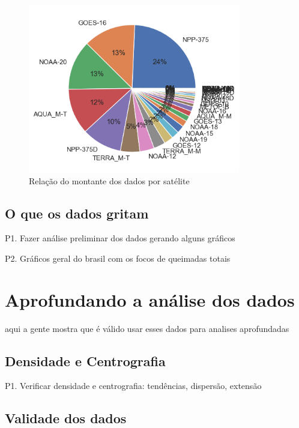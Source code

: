 \documentclass[cic,tc]{iiufrgs}
\begin{document}
\begin{figure}
    \caption{Relação do montante dos dados por satélite}
    \begin{center}
        \includegraphics[width=25em]{porcentagem_satelites}
    \end{center}
    \label{fig:porcentagem_satelites}
\end{figure}

\section{O que os dados gritam}

P1. Fazer análise preliminar dos dados gerando alguns gráficos \par
P2. Gráficos geral do brasil com os focos de queimadas totais \cite{geographicDataSciencePython} \par


\chapter{Aprofundando a análise dos dados}

aqui a gente mostra que é válido usar esses dados para analises aprofundadas

\section{Densidade e Centrografia}

P1. Verificar densidade e centrografia: tendências, dispersão, extensão \par

\section{Validade dos dados}
\end{document}
